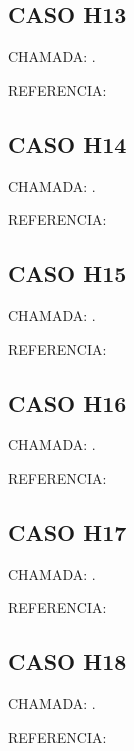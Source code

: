 \documentclass{undftex}
\begin{document}
\begin{refsection}\section*{CASO H13} CHAMADA: . \textcite{H13a}\par REFERENCIA:\par\printbibliography[heading=none,check=undfconsultadas]\end{refsection}\clearpage
\begin{refsection}\section*{CASO H14} CHAMADA: . \textcite{H14a}\par REFERENCIA:\par\printbibliography[heading=none,check=undfconsultadas]\end{refsection}\clearpage
\begin{refsection}\section*{CASO H15} CHAMADA: . \textcite{H15a}\par REFERENCIA:\par\printbibliography[heading=none,check=undfconsultadas]\end{refsection}\clearpage
\begin{refsection}\section*{CASO H16} CHAMADA: . \textcite{H16a}\par REFERENCIA:\par\printbibliography[heading=none,check=undfconsultadas]\end{refsection}\clearpage
\begin{refsection}\section*{CASO H17} CHAMADA: . \textcite{H17a}\par REFERENCIA:\par\printbibliography[heading=none,check=undfconsultadas]\end{refsection}\clearpage
\begin{refsection}\section*{CASO H18} CHAMADA: . \textcite{H18a}\par REFERENCIA:\par\printbibliography[heading=none,check=undfconsultadas]\end{refsection}\clearpage
\end{document}
